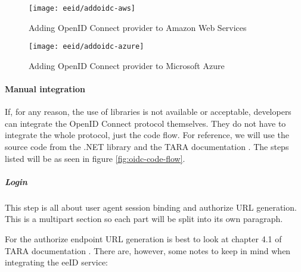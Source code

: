 \begin{figure}
  \centering
  \texttt{[image: eeid/addoidc-aws]}
  \caption{Adding OpenID Connect provider to Amazon Web Services}
  \label{fig:addoidc-aws}
\end{figure}

\begin{figure}
  \centering
  \texttt{[image: eeid/addoidc-azure]}
  \caption{Adding OpenID Connect provider to Microsoft Azure}
  \label{fig:addoidc-azure}
\end{figure}

\paragraph{Manual integration} If, for any reason, the use of libraries is not available or acceptable, developers can integrate the OpenID Connect protocol themselves. They do not have to integrate the whole protocol, just the code flow. For reference, we will use the source code from the {.NET} library \cite{ms-auth-oidc-src} and the TARA documentation \cite{tara-technical}. The steps listed will be as seen in figure \ref{fig:oidc-code-flow}.

\subparagraph{Login}

This step is all about user agent session binding and {authorize URL} generation. This is a multipart section so each part will be split into its own paragraph.

For the {authorize} endpoint URL generation is best to look at chapter 4.1 of TARA documentation \cite{tara-technical}. There are, however, some notes to keep in mind when integrating the eeID service:

